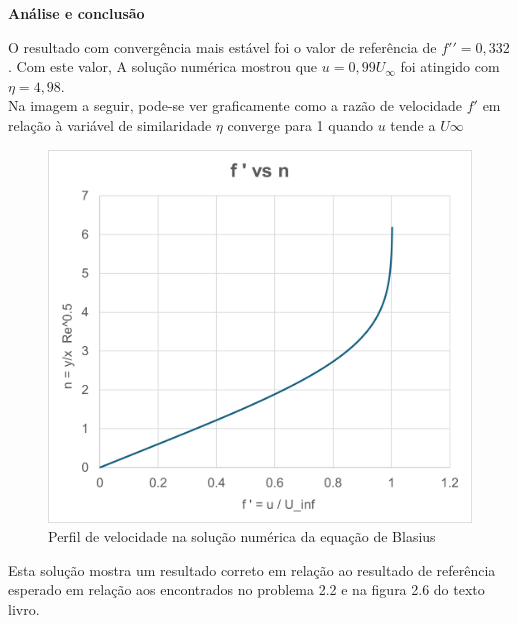 \documentclass[12pt]{article}
\begin{document}
 
 \textbf{Análise e conclusão}
 
 O resultado com convergência mais estável foi o valor de referência de $f\prime\prime =0,332$. Com este valor, A solução numérica mostrou que $u=0,99U_{\infty}$ foi atingido com $\eta = 4,98$.\\
 
 Na imagem a seguir, pode-se ver graficamente como a razão de velocidade $f\prime$ em relação à variável de similaridade $\eta$ converge para 1 quando $u$ tende a $U\infty$
 


\begin{figure}[H]
	\centering
	\includegraphics[width=.65\textwidth]{Figures/1_3}
	\caption{Perfil de velocidade na solução numérica da equação de Blasius}
\end{figure}

 Esta solução mostra um resultado correto em relação ao resultado de referência esperado em relação aos encontrados no problema 2.2 e na figura 2.6 do texto livro.
\end{document}
